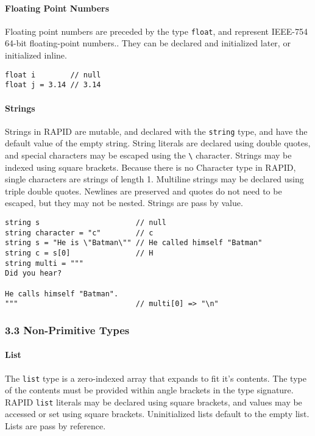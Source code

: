 \paragraph{Floating Point Numbers}\label{floating-point-numbers}

Floating point numbers are preceded by the type \texttt{float}, and
represent IEEE-754 64-bit floating-point numbers.. They can be declared
and initialized later, or initialized inline.

\begin{verbatim}
float i        // null
float j = 3.14 // 3.14
\end{verbatim}

\paragraph{Strings}\label{strings}

Strings in RAPID are mutable, and declared with the \texttt{string}
type, and have the default value of the empty string. String literals
are declared using double quotes, and special characters may be escaped
using the \texttt{\textbackslash{}} character. Strings may be indexed
using square brackets. Because there is no Character type in RAPID,
single characters are strings of length 1. Multiline strings may be
declared using triple double quotes. Newlines are preserved and quotes
do not need to be escaped, but they may not be nested. Strings are pass
by value.

\begin{verbatim}
string s                      // null
string character = "c"        // c
string s = "He is \"Batman\"" // He called himself "Batman"
string c = s[0]               // H
string multi = """
Did you hear?

He calls himself "Batman".
"""                           // multi[0] => "\n"
\end{verbatim}

\subsubsection*{3.3 Non-Primitive Types}\label{non-primitive-types}

\paragraph{List}\label{list}

The \texttt{list} type is a zero-indexed array that expands to fit it's
contents. The type of the contents must be provided within angle
brackets in the type signature. RAPID \texttt{list} literals may be
declared using square brackets, and values may be accessed or set using
square brackets. Uninitialized lists default to the empty list. Lists
are pass by reference.

